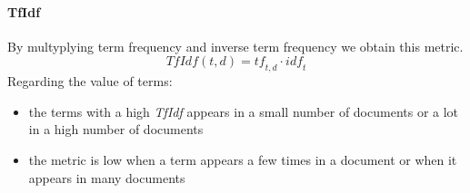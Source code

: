 \paragraph{TfIdf}
By multyplying term frequency and inverse term frequency we obtain this metric.
$$TfIdf(t, d) = \mathit{tf}_{t,d} \cdot \mathit{idf}_t$$
Regarding the value of terms:
\begin{itemize}
    \item the terms with a high \emph{TfIdf} appears in a small number of documents or 
    a lot in a high number of documents
    \item the metric is low when a term appears a few times in a document or when it appears in 
    many documents
\end{itemize}